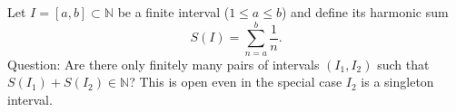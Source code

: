 Let $I=[a,b]\subset\mathbb{N}$ be a finite interval ($1\le a\le b$) and define its harmonic sum
\[S(I)=\sum_{n=a}^{b}\frac1n.\]
Question: Are there only finitely many pairs of intervals $(I_1,I_2)$ such that $S(I_1)+S(I_2)\in\mathbb{N}$?
This is open even in the special case $I_2$ is a singleton interval.
